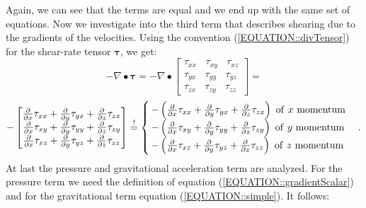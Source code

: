 \documentclass[MathematicsNumericsDerivationsAndOpenFOAM.tex]{subfiles}
\begin{document}
%
%
    Again, we can see that the terms are equal and we end up with the same set
    of equations. Now we investigate into the third term that describes shearing
    due to the gradients of the velocities.  Using the convention
    (\ref{EQUATION::divTensor}) for the shear-rate tensor $\boldsymbol \tau$, we
    get:
%
%
\begin{equation*}
  -  \nabla \bullet \boldsymbol \tau
=
  -  \nabla \bullet
  \left[
  \begin{matrix}
  \tau_{xx} ~~~~ \tau_{xy} ~~~~ \tau_{xz} \\
  \tau_{yx} ~~~~ \tau_{yy} ~~~~ \tau_{yz} \\
  \tau_{zx} ~~~~ \tau_{zy} ~~~~ \tau_{zz}
  \end{matrix}
  \right]
=
\end{equation*}
\begin{equation*}
- \left[
  \begin{matrix}
  \frac{\partial}{\partial x}\tau_{xx} + \frac{\partial}{\partial y} \tau_{yx} + \frac{\partial}{\partial z} \tau_{zx} \\
  \frac{\partial}{\partial x}\tau_{xy} + \frac{\partial}{\partial y} \tau_{yy} + \frac{\partial}{\partial z}\tau_{zy} \\
  \frac{\partial}{\partial x}\tau_{xz} + \frac{\partial}{\partial y} \tau_{yz} + \frac{\partial}{\partial z} \tau_{zz}
  \end{matrix}
  \right]
\overset{!}{=}
  \begin{cases}
  -\left(
      \frac{\partial}{\partial x}  \tau_{xx}
      +\frac{\partial}{\partial y}  \tau_{yx}
      +\frac{\partial}{\partial z}  \tau_{zx}
  \right) ~ \mathrm{of~}x ~ \mathrm{momentum} \\
  -\left(
      \frac{\partial}{\partial x}  \tau_{xy}
      +\frac{\partial}{\partial y}  \tau_{yy}
      +\frac{\partial}{\partial z}  \tau_{zy}
  \right) ~ \mathrm{of~}y ~ \mathrm{momentum} \\
    -\left(
      \frac{\partial}{\partial x}  \tau_{xz}
      +\frac{\partial}{\partial y}  \tau_{yz}
      +\frac{\partial}{\partial z}  \tau_{zz}
  \right) ~ \mathrm{of~}z ~ \mathrm{momentum}
  \end{cases}
  .
\end{equation*}
%
%
    At last the pressure and gravitational acceleration term are analyzed. For
    the pressure term we need the definition of equation
    (\ref{EQUATION::gradientScalar}) and for the gravitational term equation
    (\ref{EQUATION::simple}). It follows:
%
%
\end{document}
